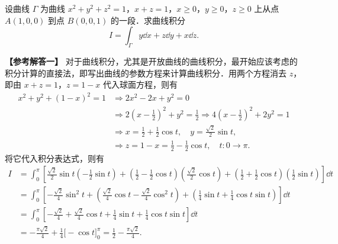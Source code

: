 设曲线 $\Gamma$ 为曲线 $x^2+y^2+z^2=1$，$x+z=1$，$x\ge 0$，$y\ge 0$，$z\ge 0$ 上从点 $A(1,0,0)$ 到点 $B(0,0,1)$ 的一段．求曲线积分
\[
  I=\int_\Gamma y\dd x+z\dd y+x\dd z.
\]
\begin{solution}
  \textbf{【参考解答一】} 对于曲线积分，尤其是开放曲线的曲线积分，最开始应该考虑的积分计算的直接法，即写出曲线的参数方程来计算曲线积分．用两个方程消去 $z$，即由 $x+z=1$，$z=1-x$ 代入球面方程，则有
  \begin{align*}
    x^2+y^2+(1-x)^2=1&\Rightarrow 2x^2-2x+y^2=0\\
    &\Rightarrow 2\left(x-\frac{1}{2}\right)^2+y^2=\frac{1}{2}
     \Rightarrow 4\left(x-\frac{1}{2}\right)^2+2y^2=1\\
    &\Rightarrow x=\frac{1}{2}+\frac{1}{2}\cos t,\quad
     y=\frac{\sqrt{2}}{2}\sin t,\\
    &\Rightarrow z=1-x=\frac{1}{2}-\frac{1}{2}\cos t,\quad t:0\to\pi.
  \end{align*}
  将它代入积分表达式，则有
  \begin{align*}
    I&=\int_0^\pi\left[
      \frac{\sqrt{2}}{2}\sin t\left(-\frac{1}{2}\sin t\right)
      +\left(\frac{1}{2}-\frac{1}{2}\cos t\right)\left(\frac{\sqrt{2}}{2}\cos t\right)
      +\left(\frac{1}{2}+\frac{1}{2}\cos t\right)\left(\frac{1}{2}\sin t\right)
      \right]\dd t\\
    &=\int_0^\pi\left[
      -\frac{\sqrt{2}}{4}\sin^2 t
      +\left(\frac{\sqrt{2}}{4}\cos t-\frac{\sqrt{2}}{4}\cos^2 t\right)
      +\left(\frac{1}{4}\sin t+\frac{1}{4}\cos t\sin t\right)
      \right]\dd t\\
    &=\int_0^\pi\left[
      -\frac{\sqrt{2}}{4}+\frac{\sqrt{2}}{4}\cos t
      +\frac{1}{4}\sin t+\frac{1}{4}\cos t\sin t
      \right]\dd t\\
    &=-\frac{\pi\sqrt{2}}{4}+\frac{1}{4}\bigl[-\cos t\bigr]_0^\pi
     =\frac{1}{2}-\frac{\pi\sqrt{2}}{4}.
  \end{align*}


\end{solution}
